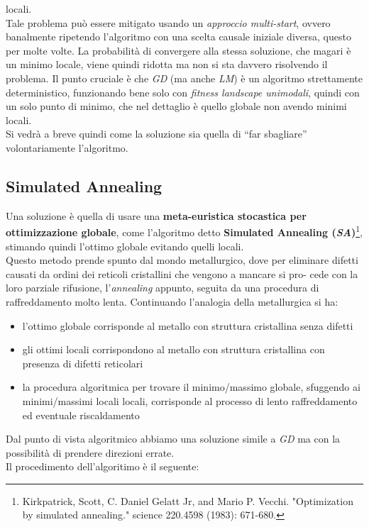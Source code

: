 \documentclass[a4paper,12pt, oneside]{book}
\begin{document}
locali.\\
Tale problema può essere mitigato usando un \textit{approccio multi-start},
ovvero banalmente ripetendo l'algoritmo con una scelta causale iniziale diversa,
questo per molte volte. La probabilità di convergere alla stessa soluzione, che
magari è un minimo locale, viene quindi ridotta ma non si sta davvero risolvendo
il problema. Il punto cruciale è che \textit{GD} (ma anche \textit{LM}) è un
algoritmo strettamente deterministico, funzionando bene solo con \textit{fitness
  landscape unimodali}, quindi con un solo punto di minimo, che nel dettaglio è
quello globale non avendo minimi locali. \\
Si vedrà a breve quindi come la soluzione sia quella di  ``far sbagliare''
volontariamente l'algoritmo.
\subsection{Simulated Annealing}
Una soluzione è quella di usare una \textbf{meta-euristica stocastica per
  ottimizzazione globale}, come l'algoritmo detto \textbf{Simulated Annealing
  (\textit{SA})}\footnote{Kirkpatrick, Scott, C. Daniel Gelatt Jr, and Mario
  P. Vecchi. "Optimization by simulated annealing." science 220.4598 (1983):
  671-680.}, stimando quindi l'ottimo globale evitando quelli locali.\\ 
Questo metodo prende spunto dal mondo metallurgico, dove per eliminare
difetti causati da ordini dei reticoli cristallini che vengono a mancare si pro-
cede con la loro parziale rifusione, l’\textit{annealing} appunto, seguita da
una procedura di raffreddamento molto lenta. Continuando l’analogia della
metallurgica si ha:
\begin{itemize}
  \item l’ottimo globale corrisponde al metallo con struttura cristallina
  senza difetti
  \item gli ottimi locali corrispondono al metallo con struttura cristallina
  con presenza di difetti reticolari
  \item la procedura algoritmica per trovare il minimo/massimo globale,
  sfuggendo 
  ai minimi/massimi locali locali, corrisponde al processo di lento
  raffreddamento 
  ed eventuale riscaldamento 
\end{itemize}
Dal punto di vista algoritmico abbiamo una soluzione simile a \textit{GD} ma con
la possibilità di prendere direzioni errate.\\
Il procedimento dell'algoritimo è il seguente:
\end{document}
